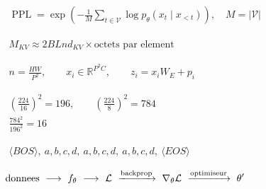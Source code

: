 \documentclass[border=4pt,multi=preview]{standalone}
\begin{document}
\begin{preview}\color{ink}\fontsize{24}{30}\selectfont
$\displaystyle \begin{gathered}\operatorname{PPL}=\exp\!\left(-\frac1M\sum_{t\in\mathcal V}\log p_\theta(x_t\mid x_{<t})\right),\quad M=|\mathcal V|\end{gathered}$
\end{preview}
\begin{preview}\color{ink}\fontsize{24}{30}\selectfont
$\displaystyle \begin{gathered}M_{KV}\approx2BLnd_{KV}\times\text{octets par element}\end{gathered}$
\end{preview}
\begin{preview}\color{ink}\fontsize{24}{30}\selectfont
$\displaystyle \begin{gathered}n=\frac{HW}{P^2},\qquad x_i\in\mathbb R^{P^2C},\qquad z_i=x_iW_E+p_i\end{gathered}$
\end{preview}
\begin{preview}\color{ink}\fontsize{24}{30}\selectfont
$\displaystyle \begin{gathered}\left(\frac{224}{16}\right)^2=196,\qquad\left(\frac{224}{8}\right)^2=784\\\frac{784^2}{196^2}=16\end{gathered}$
\end{preview}
\begin{preview}\color{ink}\fontsize{24}{30}\selectfont
$\displaystyle \begin{gathered}\langle BOS\rangle,\ a,b,c,d,\ a,b,c,d,\ a,b,c,d,\ \langle EOS\rangle\end{gathered}$
\end{preview}
\begin{preview}\color{ink}\fontsize{24}{30}\selectfont
$\displaystyle \begin{gathered}\text{donnees}\ \longrightarrow\ f_\theta\ \longrightarrow\ \mathcal L\ \xrightarrow{\rm backprop}\ \nabla_\theta\mathcal L\ \xrightarrow{\rm optimiseur}\ \theta'\end{gathered}$
\end{preview}
\end{document}

